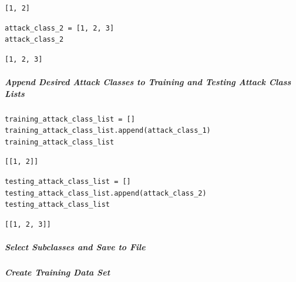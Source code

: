\begin{verbatim}
[1, 2]
\end{verbatim}

\begin{verbatim}
attack_class_2 = [1, 2, 3]
attack_class_2
\end{verbatim}

\begin{verbatim}
[1, 2, 3]
\end{verbatim}

\subparagraph{Append Desired Attack Classes to Training and Testing Attack Class Lists}

\begin{verbatim}
training_attack_class_list = []
training_attack_class_list.append(attack_class_1)
training_attack_class_list
\end{verbatim}

\begin{verbatim}
[[1, 2]]
\end{verbatim}

\begin{verbatim}
testing_attack_class_list = []
testing_attack_class_list.append(attack_class_2)
testing_attack_class_list
\end{verbatim}

\begin{verbatim}
[[1, 2, 3]]
\end{verbatim}

\subparagraph{Select Subclasses and Save to File}

\subparagraph{Create Training Data Set}

